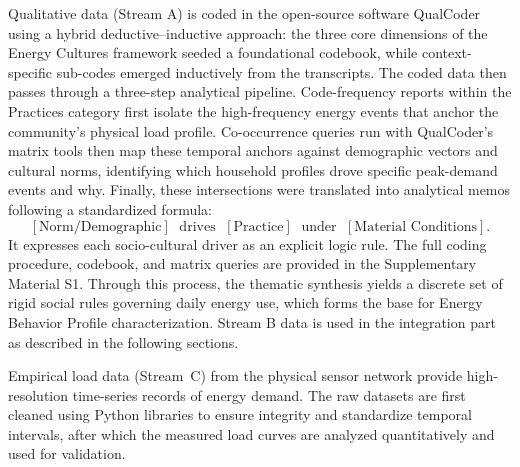 \documentclass[final,3p,times,onecolumn]{elsarticle}
\begin{document}
Qualitative data (Stream A) is coded in the open-source software QualCoder using a hybrid deductive--inductive approach: the three core dimensions of the Energy Cultures framework seeded a foundational codebook, while context-specific sub-codes emerged inductively from the transcripts. The coded data then passes through a three-step analytical pipeline. Code-frequency reports within the Practices category first isolate the high-frequency energy events that anchor the community's physical load profile. Co-occurrence queries run with QualCoder's matrix tools then map these temporal anchors against demographic vectors and cultural norms, identifying which household profiles drove specific peak-demand events and why. Finally, these intersections were translated into analytical memos following a standardized formula:
\[
[\text{Norm/Demographic}] \;\text{ drives }\; [\text{Practice}]
\;\text{ under }\; [\text{Material Conditions}].
\]
It expresses each socio-cultural driver as an explicit logic rule. The full coding procedure, codebook, and matrix queries are provided in the Supplementary Material S1. Through this process, the thematic synthesis yields a discrete set of rigid social rules governing daily energy use, which forms the base for Energy Behavior Profile characterization. Stream B data is used in the integration part as described in the following sections.

Empirical load data (Stream~C) from the physical sensor network provide high-resolution time-series records of energy demand. The raw datasets are first cleaned using Python libraries to ensure integrity and standardize temporal intervals, after which the measured load curves are analyzed quantitatively and used for validation.
\end{document}
